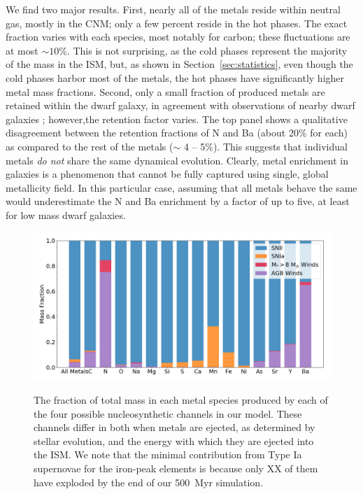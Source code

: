 \documentclass[twocolumn]{aastex61}
\begin{document}
We find two major results. First, nearly all of the metals reside within neutral gas, mostly in the CNM; only a few percent reside in the hot phases. The exact fraction varies with each species, most notably for carbon; these fluctuations are at most $\sim 10$\%. This is not surprising, as the cold phases represent the majority of the mass in the ISM, but, as shown in Section~\ref{sec:statistics}, even though the cold phases harbor most of the metals, the hot phases have significantly higher metal mass fractions. Second, only a small fraction of produced metals are retained within the dwarf galaxy, in agreement with observations of nearby dwarf galaxies \citep[see][]{Kirby2011-metals, McQuinn2015}; however,the retention factor varies. The top panel shows a qualitative disagreement between the retention fractions of N and Ba (about 20\% for each) as compared to the rest of the metals ($\sim$ 4 -- 5\%). This suggests that individual metals \textit{do not} share the same dynamical evolution. Clearly, metal enrichment in galaxies is a phenomenon that cannot be fully captured using single, global metallicity field. In this particular case, assuming that all metals behave the same would underestimate the N and Ba enrichment by a factor of up to five, at least for low mass dwarf galaxies.

\begin{figure}
\centering
\includegraphics[width=0.95\linewidth]{species_bar_sources.png}\\
\caption{The fraction of total mass in each metal species produced by each of the four possible nucleosynthetic channels in our model. These channels differ in both when metals are ejected, as determined by stellar evolution, and the energy with which they are ejected into the ISM. We note that the minimal contribution from Type Ia supernovae for the iron-peak elements is because only XX of them have exploded by the end of our 500~Myr simulation.}
%
\label{fig:species_sources}
\end{figure}
\end{document}
